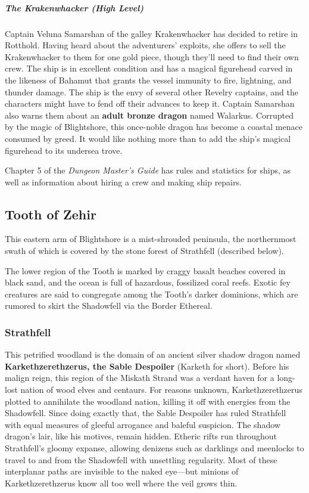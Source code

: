 \documentclass[10pt,a4paper,twoside,bg=print,twocolumn,openany,nodeprecatedcode]{dndbook}
\begin{document}
\subparagraph{The Krakenwhacker (High Level)}
Captain Veluna Samarshan of the galley Krakenwhacker has decided to retire in Rotthold. Having heard about the adventurers' exploits, she offers to sell the Krakenwhacker to them for one gold piece, though they'll need to find their own crew. The ship is in excellent condition and has a magical figurehead carved in the likeness of Bahamut that grants the vessel immunity to fire, lightning, and thunder damage. The ship is the envy of several other Revelry captains, and the characters might have to fend off their advances to keep it. Captain Samarshan also warns them about an \textbf{adult bronze dragon} named Walarkus. Corrupted by the magic of Blightshore, this once-noble dragon has become a coastal menace consumed by greed. It would like nothing more than to add the ship's magical figurehead to its undersea trove.

Chapter 5 of the \textit{Dungeon Master's Guide} has rules and statistics for ships, as well as information about hiring a crew and making ship repairs.

\subsection{Tooth of Zehir}
This eastern arm of Blightshore is a mist-shrouded peninsula, the northernmost swath of which is covered by the stone forest of Strathfell (described below).

The lower region of the Tooth is marked by craggy basalt beaches covered in black sand, and the ocean is full of hazardous, fossilized coral reefs. Exotic fey creatures are said to congregate among the Tooth's darker dominions, which are rumored to skirt the Shadowfell via the Border Ethereal.

\subsubsection{Strathfell}
This petrified woodland is the domain of an ancient silver shadow dragon named \textbf{Karkethzerethzerus, the Sable Despoiler} (Karketh for short). Before his malign reign, this region of the Miskath Strand was a verdant haven for a long-lost nation of wood elves and centaurs. For reasons unknown, Karkethzerethzerus plotted to annihilate the woodland nation, killing it off with energies from the Shadowfell. Since doing exactly that, the Sable Despoiler has ruled Strathfell with equal measures of gleeful arrogance and baleful suspicion. The shadow dragon's lair, like his motives, remain hidden. Etheric rifts run throughout Strathfell's gloomy expanse, allowing denizens such as darklings and meenlocks to travel to and from the Shadowfell with unsettling regularity. Most of these interplanar paths are invisible to the naked eye—but minions of Karkethzerethzerus know all too well where the veil grows thin.
\end{document}

